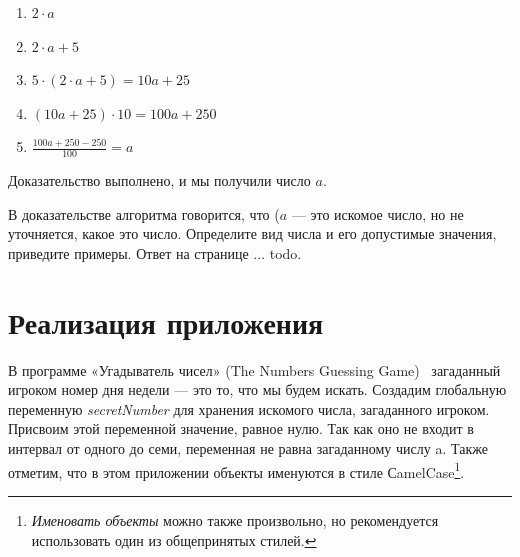 \begin{enumerate}
   \item $2\cdot a $

   \item $2\cdot a + 5$

   \item $5\cdot(2 \cdot a  + 5) = 10 a + 25$
 
   \item $(10a + 25)\cdot 10 = 100  a + 250$
 
   \item  $\frac{100  a + 250 - 250}{100} =  a $
\end{enumerate}

Доказательство выполнено, и мы получили число $  a $.

\begin{mdfstyle}[nobreak=true,frametitle=Вопрос]
  \sloppy   
  В доказательстве алгоритма говорится, что ($  a $ — это искомое число, но не уточняется, какое это число. Определите вид числа и его допустимые значения, приведите примеры.  Ответ на странице ... todo.
  \label{question:text}
\end{mdfstyle}

\section{Реализация приложения}
\label{styles}
В программе «Угадыватель чисел» (The Numbers Guessing Game)~\cite{PanfilovaApp} загаданный игроком номер дня недели — это то, что мы будем искать.
Создадим глобальную переменную  \textit{secretNumber} для хранения искомого числа, загаданного игроком. Присвоим этой переменной значение, равное нулю. Так как оно не входит в интервал от одного до семи, переменная  не равна загаданному числу a. Также
отметим, что в этом приложении  объекты именуются в стиле СamelCase\footnote[][-0cm]{ \emph{Именовать объекты} 
можно также произвольно, но рекомендуется использовать один из общепринятых стилей.
}. 

